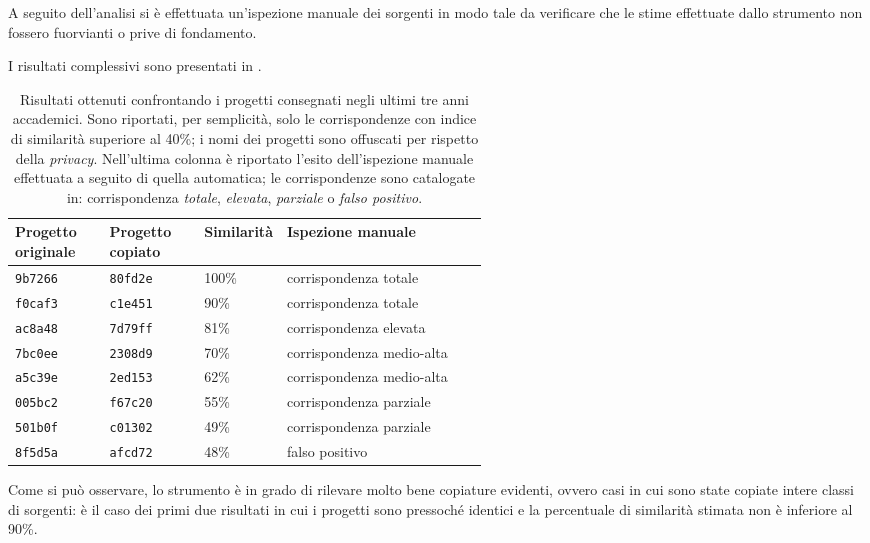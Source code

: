 A seguito dell'analisi si è effettuata un'ispezione manuale dei sorgenti in modo tale da verificare che le stime effettuate dallo strumento non fossero fuorvianti o prive di fondamento.

I risultati complessivi sono presentati in .

\begin{table}[h!]
    \centering
    \begin{tabular}{|p{0.2\linewidth}|p{0.2\linewidth}|p{0.15\linewidth}|p{}|}
        \hline
        \textbf{Progetto originale} & \textbf{Progetto copiato} & \textbf{Similarità} & \textbf{Ispezione manuale} \\ [0.5ex] 
        \hline\hline
        \texttt{9b7266} & \texttt{80fd2e} & 100\% & corrispondenza totale \\
        \hline
        \texttt{f0caf3} & \texttt{c1e451} & 90\% & corrispondenza totale \\
        \hline
        \texttt{ac8a48} & \texttt{7d79ff} & 81\% & corrispondenza elevata \\
        \hline
        \texttt{7bc0ee} & \texttt{2308d9} & 70\% & corrispondenza medio-alta \\
        \hline
        \texttt{a5c39e} & \texttt{2ed153} & 62\% & corrispondenza medio-alta \\
        \hline
        \texttt{005bc2} & \texttt{f67c20} & 55\% & corrispondenza parziale \\
        \hline
        \texttt{501b0f} & \texttt{c01302} & 49\% & corrispondenza parziale \\
        \hline
        \texttt{8f5d5a} & \texttt{afcd72} & 48\% & falso positivo \\
        \hline
    \end{tabular}
    \caption[Risultati ottenuti confrontando i progetti sottomessi negli ultimi tre anni accademici]{Risultati ottenuti confrontando i progetti consegnati negli ultimi tre anni accademici. Sono riportati, per semplicità, solo le corrispondenze con indice di similarità superiore al 40\%; i nomi dei progetti sono offuscati per rispetto della \textit{privacy}. Nell'ultima colonna è riportato l'esito dell'ispezione manuale effettuata a seguito di quella automatica; le corrispondenze sono catalogate in: corrispondenza \textit{totale}, \textit{elevata}, \textit{parziale} o \textit{falso positivo}.}
    \label{table:results}
\end{table}

Come si può osservare, lo strumento è in grado di rilevare molto bene copiature evidenti, ovvero casi in cui sono state copiate intere classi di sorgenti: è il caso dei primi due risultati in cui i progetti sono pressoché identici e la percentuale di similarità stimata non è inferiore al 90\%.
%

